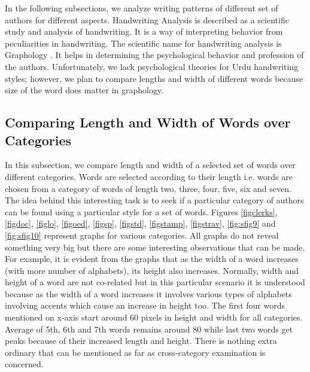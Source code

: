 In the following subsections, we analyze writing patterns of different set of authors for different aspects. Handwriting Analysis is described as a scientific study and analysis of handwriting. It is a way of interpreting behavior from peculiarities in handwriting. The scientific name for handwriting analysis is Graphology \cite{graphology}. It helps in determining the psychological behavior and profession of the authors. Unfortunately, we lack psychological theories for Urdu handwriting styles; however, we plan to compare lengths and width of different words because size of the word does matter in graphology. 


\subsection{Comparing Length and Width of Words over Categories}

In this subsection, we compare length and width of a selected set of words over different categories. Words are selected according to their length i.e. words are chosen from a category of words of length two, three, four, five, six and seven. The idea behind this interesting task is to seek if a particular category of authors can be found using a particular style for a set of words. Figures \ref{figclerks}, \ref{figdoc}, \ref{figlo}, \ref{figoed}, \ref{figsp}, \ref{figstd}, \ref{figstamp}, \ref{figstrav}, \ref{fig:sfig9} and \ref{fig:sfig10} represent graphs for various categories. All graphs do not reveal something very big but there are some interesting observations that can be made. For example, it is evident from the graphs that as the width of a word increases (with more number of alphabets), its height also increases. Normally, width and height of a word are not co-related but in this particular scenario it is understood because as the width of a word increases it involves various types of alphabets involving accents which cause an increase in height too. The first four words mentioned on x-axis start around 60 pixels in height and width for all categories. Average of 5th, 6th and 7th words remains around 80 while last two words get peaks because of their increased length and height. There is nothing extra ordinary that can be mentioned as far as cross-category examination is concerned. 









     
